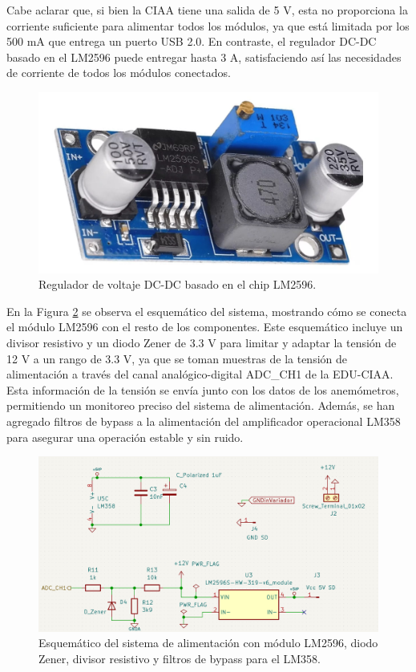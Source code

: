Cabe aclarar que, si bien la CIAA tiene una salida de 5 \unit{\volt}, esta no proporciona la corriente suficiente para alimentar todos los módulos, ya que está limitada por los 500 \unit{\milli\ampere} que entrega un puerto USB 2.0. En contraste, el regulador DC-DC basado en el LM2596 puede entregar hasta 3 \unit{\ampere}, satisfaciendo así las necesidades de corriente de todos los módulos conectados. 

\begin{figure}[H]
    \centering
    \includegraphics[width=0.6\linewidth]{Figuras/datalogger/Hardware/StepDowmLM2596S.jpg}
    \caption{Regulador de voltaje DC-DC basado en el chip LM2596.}
    \label{fig:StepDowmLM2596S}
\end{figure}

En la Figura \ref{fig:esquemPowerSupply} se observa el esquemático del sistema, mostrando cómo se conecta el módulo LM2596 con el resto de los componentes. Este esquemático incluye un divisor resistivo y un diodo Zener de 3.3 \unit{\volt} para limitar y adaptar la tensión de 12 \unit{\volt} a un rango de 3.3 \unit{\volt}, ya que se toman muestras de la tensión de alimentación a través del canal analógico-digital ADC\_CH1 de la EDU-CIAA. Esta información de la tensión se envía junto con los datos de los anemómetros, permitiendo un monitoreo preciso del sistema de alimentación. Además, se han agregado filtros de bypass a la alimentación del amplificador operacional LM358 para asegurar una operación estable y sin ruido.

\begin{figure}[H]
    \centering
    \includegraphics[width=0.9\linewidth]{Figuras/datalogger/Hardware/esquemPowerSupply.png}
    \caption{Esquemático del sistema de alimentación con módulo LM2596, diodo Zener, divisor resistivo y filtros de bypass para el LM358.}
    \label{fig:esquemPowerSupply}
\end{figure}

